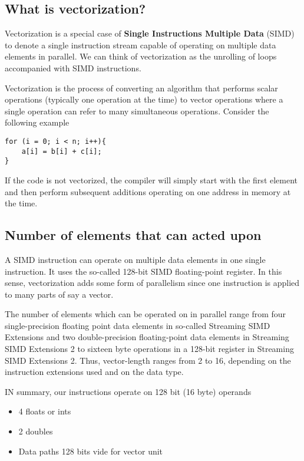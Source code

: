 \noindent



\subsection*{What is vectorization?}
Vectorization is a special
case of \textbf{Single Instructions Multiple Data} (SIMD) to denote a single
instruction stream capable of operating on multiple data elements in
parallel. 
We can think of vectorization as the unrolling of loops accompanied with SIMD instructions.

Vectorization is the process of converting an algorithm that performs scalar operations
(typically one operation at the time) to vector operations where a single operation can refer to many simultaneous operations.
Consider the following example




\begin{verbatim}
for (i = 0; i < n; i++){
    a[i] = b[i] + c[i];
}

\end{verbatim}

If the code is not vectorized, the compiler will simply start with the first element and 
then perform subsequent additions operating on one address in memory at the time. 

\subsection*{Number of elements that can acted upon}
A SIMD instruction can operate  on multiple data elements in one single instruction.
It uses the so-called 128-bit SIMD floating-point register. 
In this sense, vectorization adds some form of parallelism since one instruction is applied  
to many parts of say a vector.

The number of elements which can be operated on in parallel
range from four single-precision floating point data elements in so-called 
Streaming SIMD Extensions and two double-precision floating-point data
elements in Streaming SIMD Extensions 2 to sixteen byte operations in
a 128-bit register in Streaming SIMD Extensions 2. Thus, vector-length
ranges from 2 to 16, depending on the instruction extensions used and
on the data type. 

IN summary, our instructions  operate on 128 bit (16 byte) operands
\begin{itemize}
\item 4 floats or ints

\item 2 doubles

\item Data paths 128 bits vide for vector unit
\end{itemize}

